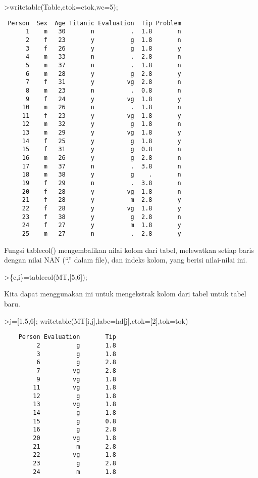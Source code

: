 \documentclass[
]{book}
\begin{document}
\textgreater writetable(Table,ctok=ctok,wc=5);

\begin{verbatim}
 Person  Sex  Age Titanic Evaluation  Tip Problem
      1    m   30       n          .  1.8       n
      2    f   23       y          g  1.8       n
      3    f   26       y          g  1.8       y
      4    m   33       n          .  2.8       n
      5    m   37       n          .  1.8       n
      6    m   28       y          g  2.8       y
      7    f   31       y         vg  2.8       n
      8    m   23       n          .  0.8       n
      9    f   24       y         vg  1.8       y
     10    m   26       n          .  1.8       n
     11    f   23       y         vg  1.8       y
     12    m   32       y          g  1.8       n
     13    m   29       y         vg  1.8       y
     14    f   25       y          g  1.8       y
     15    f   31       y          g  0.8       n
     16    m   26       y          g  2.8       n
     17    m   37       n          .  3.8       n
     18    m   38       y          g    .       n
     19    f   29       n          .  3.8       n
     20    f   28       y         vg  1.8       n
     21    f   28       y          m  2.8       y
     22    f   28       y         vg  1.8       y
     23    f   38       y          g  2.8       n
     24    f   27       y          m  1.8       y
     25    m   27       n          .  2.8       y
\end{verbatim}

Fungsi tablecol() mengembalikan nilai kolom dari tabel, melewatkan setiap baris dengan nilai NAN (``.'' dalam file), dan indeks kolom, yang berisi nilai-nilai ini.

\textgreater\{c,i\}=tablecol(MT,{[}5,6{]});

Kita dapat menggunakan ini untuk mengekstrak kolom dari tabel untuk tabel baru.

\textgreater j={[}1,5,6{]}; writetable(MT{[}i,j{]},labc=hd{[}j{]},ctok={[}2{]},tok=tok)

\begin{verbatim}
    Person Evaluation       Tip
         2          g       1.8
         3          g       1.8
         6          g       2.8
         7         vg       2.8
         9         vg       1.8
        11         vg       1.8
        12          g       1.8
        13         vg       1.8
        14          g       1.8
        15          g       0.8
        16          g       2.8
        20         vg       1.8
        21          m       2.8
        22         vg       1.8
        23          g       2.8
        24          m       1.8
\end{verbatim}
\end{document}
